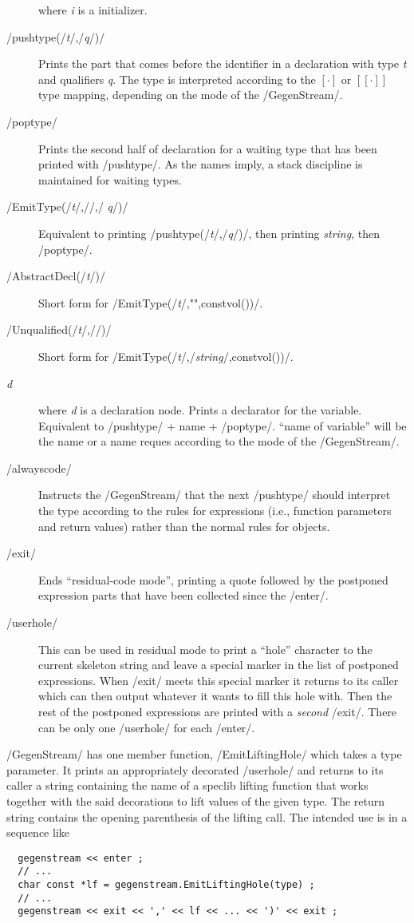 \begin{docpart}
\begin{description}
  where \textit{i} is a \coreC initializer.
\item[/pushtype(/\textit{\mdseries t}/,/\textit{\mdseries q}/)/]
  Prints the part that comes before the identifier in a declaration
  with type \textit{t} and qualifiers \textit{q}. The type is
  interpreted according to the $[\cdot]$ or $[\![\cdot]\!]$ type
  mapping, depending on the mode of the /GegenStream/.
\item[/poptype/]
  Prints the second half of declaration for a waiting type that has
  been printed with /pushtype/. As the names imply, a stack discipline
  is maintained for waiting types.
\item[/EmitType(/\textit{\mdseries t}/,/\textit{\mdseries{string}}/,/%
	\textit{\mdseries q}/)/]
  Equivalent to printing /pushtype(/\textit{t}/,/\textit{q}/)/, then
  printing \textit{string}, then /poptype/.
\item[/AbstractDecl(/\textit{\mdseries t}/)/]
  Short form for /EmitType(/\textit{t}/,"",constvol())/.
\item[/Unqualified(/\textit{\mdseries t}/,/\textit{\mdseries{string}}/)/]
  Short form for /EmitType(/\textit{t}/,/\textit{string}/,constvol())/.
\item[\textit{\mdseries d}]
  where \textit{d} is a \coreC declaration node. Prints a declarator
  for the variable. Equivalent to /pushtype/ + name + /poptype/.
  ``name of variable'' will be the \Pgen name or a name reques
  according to the mode of the /GegenStream/.
\item[/alwayscode/]
  Instructs the /GegenStream/ that the next /pushtype/ should interpret
  the type according to the rules for expressions (i.e., function
  parameters and return values) rather than the normal rules for
  objects.
\item[/exit/]
  Ends ``residual-code mode'', printing a quote followed by the
  postponed expression parts that have been collected since the
  /enter/.
\item[/userhole/]
  This can be used in residual mode to print a ``hole'' character
  to the current skeleton string and leave a special marker in
  the list of postponed expressions. When /exit/ meets this special
  marker it returns to its caller which can then output whatever
  \Pgen it wants to fill this hole with. Then the rest of the
  postponed expressions are printed with a \emph{second} /exit/.
  There can be only one /userhole/ for each /enter/.
\end{description}

/GegenStream/ has one member function, /EmitLiftingHole/ which takes
a \coreC type parameter. It prints an appropriately decorated
/userhole/ and returns to its caller a string containing the name
of a speclib lifting function that works together with the said
decorations to lift values of the given type. The return string
contains the opening parenthesis of the lifting call. The intended
use is in a sequence like
\begin{verbatim}
  gegenstream << enter ;
  // ...
  char const *lf = gegenstream.EmitLiftingHole(type) ;
  // ...
  gegenstream << exit << ',' << lf << ... << ')' << exit ;
\end{verbatim}


\end{docpart}
